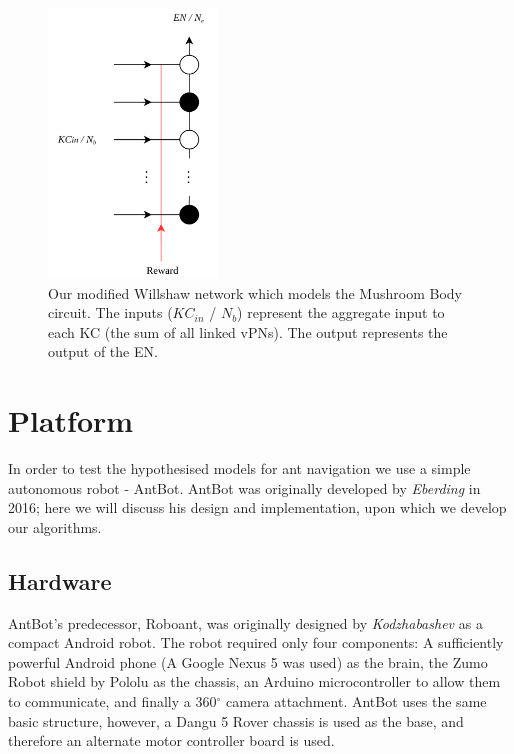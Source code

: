 \documentclass[a4paper,12pt,twoside,openright]{article}
\begin{document}
\begin{figure}[h]
 
  \centering
  \includegraphics[width=0.4\textwidth]{WillshawMB}
  \caption{
    \label{fig:willshawmb} Our modified Willshaw network which models the Mushroom Body circuit. The inputs ($KC_{in}$ / $N_b$)
    represent the aggregate input to each KC (the sum of all linked vPNs). The output represents the output of the EN.
  }
 
\end{figure}
\newpage

\section{ Platform } \label{sec:platform}
In order to test the hypothesised models for ant navigation we use a simple autonomous robot - AntBot.
AntBot was originally developed by \textit{Eberding} in 2016; here we will discuss his design and
implementation, upon which we develop our algorithms.

\subsection{ Hardware }
AntBot's predecessor, Roboant, was originally designed by \textit{Kodzhabashev} \cite{Kodzhabashev2014}
as a compact Android robot. The robot required only four components: A sufficiently powerful Android
phone (A Google Nexus 5 was used) as the brain, the Zumo Robot shield by Pololu as the chassis,
an Arduino microcontroller to allow them to communicate, and finally a 360$^{\circ}$ camera attachment.
AntBot uses the same basic structure, however, a Dangu 5 Rover chassis is used as the base, and
therefore an alternate motor controller board is used.
\newline
\end{document}
